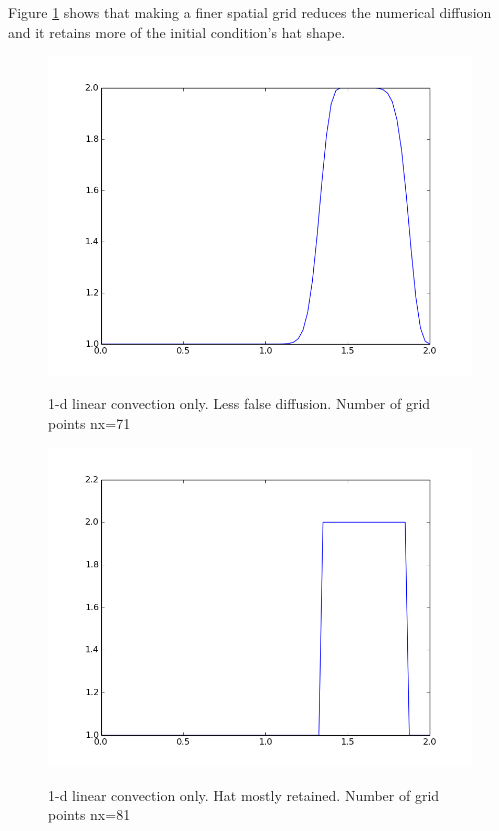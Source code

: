 \documentclass[11pt]{article}
\begin{document}
{Figure \ref{fig:num_diff_fine_mesh} shows that making a finer spatial grid reduces the
numerical diffusion and it retains more of the initial condition's hat shape.

	\begin{figure}[H]
	\centering
	\caption{1-d linear convection only. Less false diffusion. Number of grid points nx=71}
	\includegraphics[scale=0.6]{better_hat.png}
	\label{fig:num_diff_fine_mesh}
	\end{figure}

	\begin{figure}[H]
	\centering
	\caption{1-d linear convection only. Hat mostly retained. Number of grid points nx=81}
	\includegraphics[scale=0.6]{keep_hat.png}
	\label{fig:num_diff_finest_mesh}
	\end{figure}

}
\end{document}

